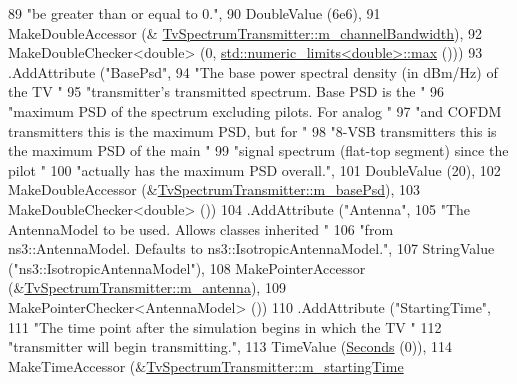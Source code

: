 \begin{DoxyCode}
89                    \textcolor{stringliteral}{"be greater than or equal to 0."},
90                    DoubleValue (6e6),
91                    MakeDoubleAccessor (&
      \hyperlink{classns3_1_1TvSpectrumTransmitter_a6e9866a446454a46b3a64be122931c95}{TvSpectrumTransmitter::m\_channelBandwidth}),
92                    MakeDoubleChecker<double> (0, 
      \hyperlink{80211b_8c_affe776513b24d84b39af8ab0930fef7f}{std::numeric\_limits<double>::max} ()))
93     .AddAttribute (\textcolor{stringliteral}{"BasePsd"},
94                    \textcolor{stringliteral}{"The base power spectral density (in dBm/Hz) of the TV "}
95                    \textcolor{stringliteral}{"transmitter's transmitted spectrum. Base PSD is the "}
96                    \textcolor{stringliteral}{"maximum PSD of the spectrum excluding pilots. For analog "}
97                    \textcolor{stringliteral}{"and COFDM transmitters this is the maximum PSD, but for "}
98                    \textcolor{stringliteral}{"8-VSB transmitters this is the maximum PSD of the main "}
99                    \textcolor{stringliteral}{"signal spectrum (flat-top segment) since the pilot "}
100                    \textcolor{stringliteral}{"actually has the maximum PSD overall."},
101                    DoubleValue (20),
102                    MakeDoubleAccessor (&\hyperlink{classns3_1_1TvSpectrumTransmitter_a2d1d8e8127f61ed696bee9acf2ea2de2}{TvSpectrumTransmitter::m\_basePsd}),
103                    MakeDoubleChecker<double> ())
104     .AddAttribute (\textcolor{stringliteral}{"Antenna"},
105                    \textcolor{stringliteral}{"The AntennaModel to be used. Allows classes inherited "}
106                    \textcolor{stringliteral}{"from ns3::AntennaModel. Defaults to ns3::IsotropicAntennaModel."},
107                    StringValue (\textcolor{stringliteral}{"ns3::IsotropicAntennaModel"}),
108                    MakePointerAccessor (&\hyperlink{classns3_1_1TvSpectrumTransmitter_a1503f457fc9047fa63f0990cdb3fe8b6}{TvSpectrumTransmitter::m\_antenna}),
109                    MakePointerChecker<AntennaModel> ())
110     .AddAttribute (\textcolor{stringliteral}{"StartingTime"},
111                    \textcolor{stringliteral}{"The time point after the simulation begins in which the TV "}
112                    \textcolor{stringliteral}{"transmitter will begin transmitting."},
113                    TimeValue (\hyperlink{group__timecivil_ga33c34b816f8ff6628e33d5c8e9713b9e}{Seconds} (0)),
114                    MakeTimeAccessor (&\hyperlink{classns3_1_1TvSpectrumTransmitter_a792038cd396efdc81c8f6ee2d54a0fd2}{TvSpectrumTransmitter::m\_startingTime}

\end{DoxyCode}
